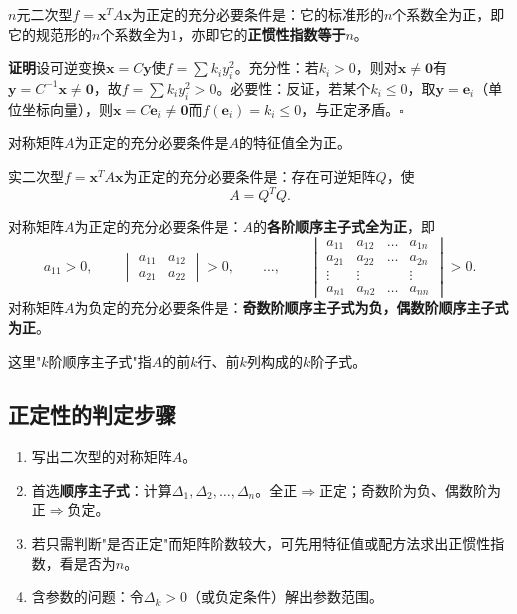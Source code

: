 \begin{theorem}[正定的标准形判据]
$n$元二次型$f=\boldsymbol{x}^{T}A\boldsymbol{x}$为正定的充分必要条件是：它的标准形的$n$个系数全为正，即它的规范形的$n$个系数全为$1$，亦即它的\textbf{正惯性指数等于$n$}。
\end{theorem}

\textbf{证明}\quad 设可逆变换$\boldsymbol{x}=C\boldsymbol{y}$使$f=\sum k_iy_i^{2}$。充分性：若$k_i>0$，则对$\boldsymbol{x}\ne\boldsymbol{0}$有$\boldsymbol{y}=C^{-1}\boldsymbol{x}\ne\boldsymbol{0}$，故$f=\sum k_iy_i^{2}>0$。必要性：反证，若某个$k_i\le0$，取$\boldsymbol{y}=\boldsymbol{e}_i$（单位坐标向量），则$\boldsymbol{x}=C\boldsymbol{e}_i\ne\boldsymbol{0}$而$f(\boldsymbol{e}_i)=k_i\le0$，与正定矛盾。\hfill$\square$

\begin{corollary}[特征值判据]
对称矩阵$A$为正定的充分必要条件是$A$的特征值全为正。
\end{corollary}

\begin{corollary}[$A=Q^{T}Q$判据]
实二次型$f=\boldsymbol{x}^{T}A\boldsymbol{x}$为正定的充分必要条件是：存在可逆矩阵$Q$，使
\[
A=Q^{T}Q .
\]
\end{corollary}

\begin{theorem}
对称矩阵$A$为正定的充分必要条件是：$A$的\textbf{各阶顺序主子式全为正}，即
\[
a_{11}>0,\qquad
\begin{vmatrix}a_{11}&a_{12}\\a_{21}&a_{22}\end{vmatrix}>0,\qquad\dots,\qquad
\begin{vmatrix}
a_{11}&a_{12}&\dots&a_{1n}\\
a_{21}&a_{22}&\dots&a_{2n}\\
\vdots&\vdots&&\vdots\\
a_{n1}&a_{n2}&\dots&a_{nn}
\end{vmatrix}>0 .
\]
对称矩阵$A$为负定的充分必要条件是：\textbf{奇数阶顺序主子式为负，偶数阶顺序主子式为正}。
\end{theorem}

这里"$k$阶顺序主子式"指$A$的前$k$行、前$k$列构成的$k$阶子式。

\subsection{正定性的判定步骤}
\begin{enumerate}
    \item 写出二次型的对称矩阵$A$。
    \item 首选\textbf{顺序主子式}：计算$\Delta_1,\Delta_2,\dots,\Delta_n$。全正$\Rightarrow$正定；奇数阶为负、偶数阶为正$\Rightarrow$负定。
    \item 若只需判断"是否正定"而矩阵阶数较大，可先用特征值或配方法求出正惯性指数，看是否为$n$。
    \item 含参数的问题：令$\Delta_k>0$（或负定条件）解出参数范围。
\end{enumerate}

